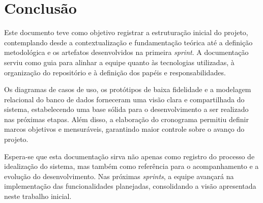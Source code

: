 \chapter{Conclusão}\label{cap:conclusao}

Este documento teve como objetivo registrar a estruturação inicial do projeto, contemplando desde a contextualização e fundamentação teórica até a definição metodológica e os artefatos desenvolvidos na primeira \textit{sprint}. A documentação serviu como guia para alinhar a equipe quanto às tecnologias utilizadas, à organização do repositório e à definição dos papéis e responsabilidades.

Os diagramas de casos de uso, os protótipos de baixa fidelidade e a modelagem relacional do banco de dados forneceram uma visão clara e compartilhada do sistema, estabelecendo uma base sólida para o desenvolvimento a ser realizado nas próximas etapas. Além disso, a elaboração do cronograma permitiu definir marcos objetivos e mensuráveis, garantindo maior controle sobre o avanço do projeto.

Espera-se que esta documentação sirva não apenas como registro do processo de idealização do sistema, mas também como referência para o acompanhamento e a evolução do desenvolvimento. Nas próximas \textit{sprints}, a equipe avançará na implementação das funcionalidades planejadas, consolidando a visão apresentada neste trabalho inicial.